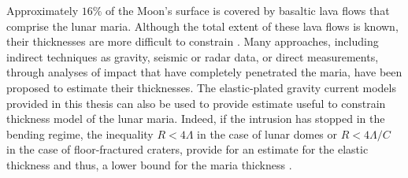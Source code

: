 Approximately $16\%$ of the Moon's surface is covered by basaltic lava
flows  that comprise  the lunar  maria. Although  the total  extent of
these lava  flows is  known, their thicknesses  are more  difficult to
constrain \citep{Thomson:2009eo}. Many  approaches, including indirect
techniques as gravity, seismic or  radar data, or direct measurements,
through analyses of impact that  have completely penetrated the maria,
have been proposed to  estimate their thicknesses.  The elastic-plated
gravity current  models provided in  this thesis  can also be  used to
provide  estimate useful  to constrain  thickness model  of the  lunar
maria.  Indeed,  if the intrusion  has stopped in the  bending regime,
the  inequality  $R<   4\Lambda$  in  the  case  of   lunar  domes  or
$R<4\Lambda/C$ in the case of  floor-fractured craters, provide for an
estimate for  the elastic thickness  and thus,  a lower bound  for the
maria thickness
.


